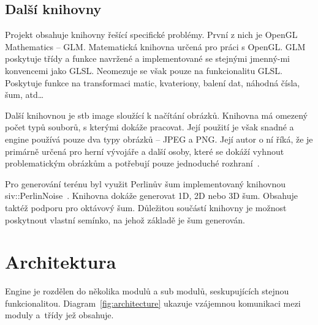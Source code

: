 \documentclass[thesis=M,czech]{FITthesis}[2019/12/23]
\begin{document}
\section{Další knihovny}

Projekt obsahuje knihovny řešící specifické problémy. První z nich je OpenGL Mathematics -- GLM. Matematická knihovna určená pro práci s OpenGL. GLM poskytuje třídy a funkce navržené a implementované se stejnými jmenný-mi konvencemi jako GLSL. Neomezuje se však pouze na funkcionalitu GLSL. Poskytuje funkce na transformaci matic, kvateriony, balení dat, náhodná čísla, šum, atd\dots~\cite{glm_main}

Další knihovnou je stb image sloužící k načítání obrázků. Knihovna má omezený počet typů souborů, s kterými dokáže pracovat. Její použití je však snadné a engine používá pouze dva typy obrázků – JPEG a PNG. Její autor o ní říká, že je primárně určená pro herní vývojáře a další osoby, které se dokáží vyhnout problematickým obrázkům a potřebují pouze jednoduché rozhraní~\cite{stb_image}.

Pro generování terénu byl využit Perlinův šum implementovaný knihovnou siv::PerlinNoise~\cite{perlin}. Knihovna dokáže generovat 1D, 2D nebo 3D šum. Obsahuje taktéž podporu pro oktávový šum. Důležitou součástí knihovny je možnost poskytnout vlastní semínko, na jehož základě je šum generován.


\chapter{Architektura}

Engine je rozdělen do několika modulů a sub modulů, seskupujících stejnou funkcionalitou. Diagram~\ref{fig:architecture} ukazuje vzájemnou komunikaci mezi moduly a~třídy jež obsahuje.
\end{document}
